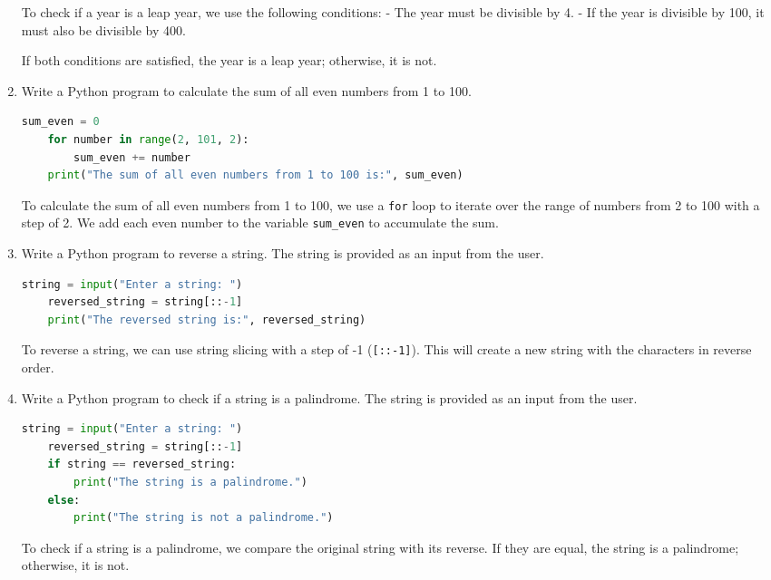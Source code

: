 \documentclass[12pt]{book}
\begin{document}
\begin{enumerate}
    To check if a year is a leap year, we use the following conditions:
    - The year must be divisible by 4.
    - If the year is divisible by 100, it must also be divisible by 400.

    If both conditions are satisfied, the year is a leap year; otherwise, it is not.

    \item Write a Python program to calculate the sum of all even numbers from 1 to 100.

    \begin{lstlisting}[language=Python]
    sum_even = 0
    for number in range(2, 101, 2):
        sum_even += number
    print("The sum of all even numbers from 1 to 100 is:", sum_even)
    \end{lstlisting}

    To calculate the sum of all even numbers from 1 to 100, we use a \texttt{for} loop to iterate over the range of numbers from 2 to 100 with a step of 2. We add each even number to the variable \texttt{sum\_even} to accumulate the sum.

    \item Write a Python program to reverse a string. The string is provided as an input from the user.

    \begin{lstlisting}[language=Python]
    string = input("Enter a string: ")
    reversed_string = string[::-1]
    print("The reversed string is:", reversed_string)
    \end{lstlisting}

    To reverse a string, we can use string slicing with a step of -1 (\texttt{[::-1]}). This will create a new string with the characters in reverse order.

    \item Write a Python program to check if a string is a palindrome. The string is provided as an input from the user.

    \begin{lstlisting}[language=Python]
    string = input("Enter a string: ")
    reversed_string = string[::-1]
    if string == reversed_string:
        print("The string is a palindrome.")
    else:
        print("The string is not a palindrome.")
    \end{lstlisting}

    To check if a string is a palindrome, we compare the original string with its reverse. If they are equal, the string is a palindrome; otherwise, it is not.


\end{enumerate}
\end{document}
